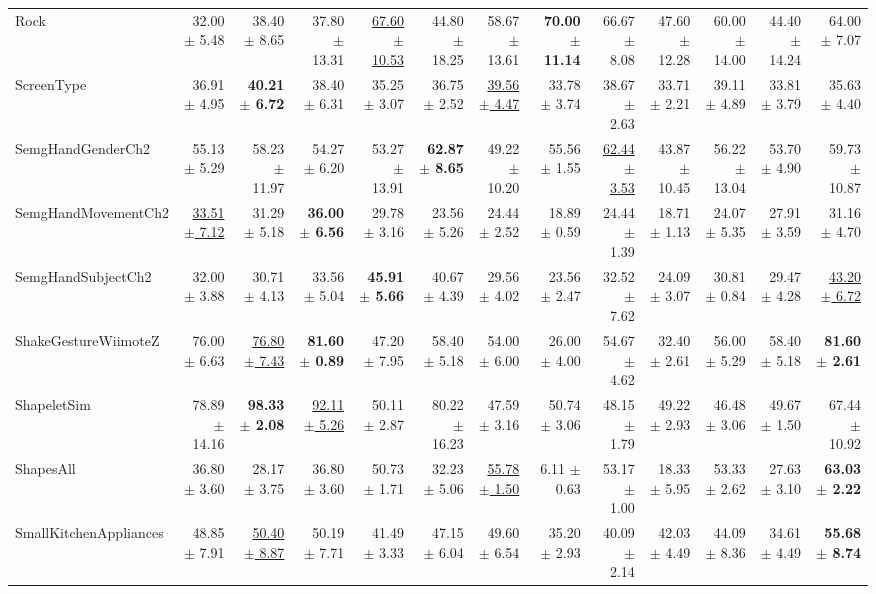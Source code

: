 \begin{landscape}
\begin{longtable}{lrrrrrrrrrrrr}
Rock & 32.00 $\pm$ 5.48 & 38.40 $\pm$ 8.65 & 37.80 $\pm$ 13.31 & \underline{67.60 $\pm$ 10.53} & 44.80 $\pm$ 18.25 & 58.67 $\pm$ 13.61 & \textbf{70.00 $\pm$ 11.14} & 66.67 $\pm$ 8.08 & 47.60 $\pm$ 12.28 & 60.00 $\pm$ 14.00 & 44.40 $\pm$ 14.24 & 64.00 $\pm$ 7.07 \\
ScreenType & 36.91 $\pm$ 4.95 & \textbf{40.21 $\pm$ 6.72} & 38.40 $\pm$ 6.31 & 35.25 $\pm$ 3.07 & 36.75 $\pm$ 2.52 & \underline{39.56 $\pm$ 4.47} & 33.78 $\pm$ 3.74 & 38.67 $\pm$ 2.63 & 33.71 $\pm$ 2.21 & 39.11 $\pm$ 4.89 & 33.81 $\pm$ 3.79 & 35.63 $\pm$ 4.40 \\
SemgHandGenderCh2 & 55.13 $\pm$ 5.29 & 58.23 $\pm$ 11.97 & 54.27 $\pm$ 6.20 & 53.27 $\pm$ 13.91 & \textbf{62.87 $\pm$ 8.65} & 49.22 $\pm$ 10.20 & 55.56 $\pm$ 1.55 & \underline{62.44 $\pm$ 3.53} & 43.87 $\pm$ 10.45 & 56.22 $\pm$ 13.04 & 53.70 $\pm$ 4.90 & 59.73 $\pm$ 10.87 \\
SemgHandMovementCh2 & \underline{33.51 $\pm$ 7.12} & 31.29 $\pm$ 5.18 & \textbf{36.00 $\pm$ 6.56} & 29.78 $\pm$ 3.16 & 23.56 $\pm$ 5.26 & 24.44 $\pm$ 2.52 & 18.89 $\pm$ 0.59 & 24.44 $\pm$ 1.39 & 18.71 $\pm$ 1.13 & 24.07 $\pm$ 5.35 & 27.91 $\pm$ 3.59 & 31.16 $\pm$ 4.70 \\
SemgHandSubjectCh2 & 32.00 $\pm$ 3.88 & 30.71 $\pm$ 4.13 & 33.56 $\pm$ 5.04 & \textbf{45.91 $\pm$ 5.66} & 40.67 $\pm$ 4.39 & 29.56 $\pm$ 4.02 & 23.56 $\pm$ 2.47 & 32.52 $\pm$ 7.62 & 24.09 $\pm$ 3.07 & 30.81 $\pm$ 0.84 & 29.47 $\pm$ 4.28 & \underline{43.20 $\pm$ 6.72} \\
ShakeGestureWiimoteZ & 76.00 $\pm$ 6.63 & \underline{76.80 $\pm$ 7.43} & \textbf{81.60 $\pm$ 0.89} & 47.20 $\pm$ 7.95 & 58.40 $\pm$ 5.18 & 54.00 $\pm$ 6.00 & 26.00 $\pm$ 4.00 & 54.67 $\pm$ 4.62 & 32.40 $\pm$ 2.61 & 56.00 $\pm$ 5.29 & 58.40 $\pm$ 5.18 & \textbf{81.60 $\pm$ 2.61} \\
ShapeletSim & 78.89 $\pm$ 14.16 & \textbf{98.33 $\pm$ 2.08} & \underline{92.11 $\pm$ 5.26} & 50.11 $\pm$ 2.87 & 80.22 $\pm$ 16.23 & 47.59 $\pm$ 3.16 & 50.74 $\pm$ 3.06 & 48.15 $\pm$ 1.79 & 49.22 $\pm$ 2.93 & 46.48 $\pm$ 3.06 & 49.67 $\pm$ 1.50 & 67.44 $\pm$ 10.92 \\
ShapesAll & 36.80 $\pm$ 3.60 & 28.17 $\pm$ 3.75 & 36.80 $\pm$ 3.60 & 50.73 $\pm$ 1.71 & 32.23 $\pm$ 5.06 & \underline{55.78 $\pm$ 1.50} & 6.11 $\pm$ 0.63 & 53.17 $\pm$ 1.00 & 18.33 $\pm$ 5.95 & 53.33 $\pm$ 2.62 & 27.63 $\pm$ 3.10 & \textbf{63.03 $\pm$ 2.22} \\
SmallKitchenAppliances & 48.85 $\pm$ 7.91 & \underline{50.40 $\pm$ 8.87} & 50.19 $\pm$ 7.71 & 41.49 $\pm$ 3.33 & 47.15 $\pm$ 6.04 & 49.60 $\pm$ 6.54 & 35.20 $\pm$ 2.93 & 40.09 $\pm$ 2.14 & 42.03 $\pm$ 4.49 & 44.09 $\pm$ 8.36 & 34.61 $\pm$ 4.49 & \textbf{55.68 $\pm$ 8.74} \\

\end{longtable}
\end{landscape}
